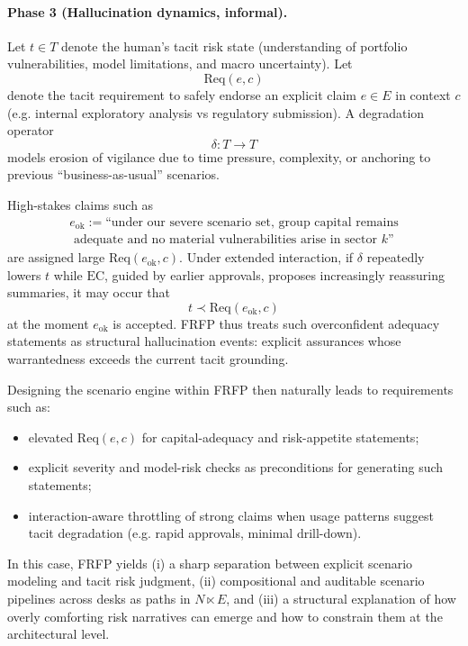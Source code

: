 \paragraph{Phase 3 (Hallucination dynamics, informal).}
Let \(t \in T\) denote the human's tacit risk state (understanding of portfolio vulnerabilities, model limitations, and macro uncertainty). Let
\[
  \mathrm{Req}(e,c)
\]
denote the tacit requirement to safely endorse an explicit claim \(e \in E\) in context \(c\) (e.g. internal exploratory analysis vs regulatory submission). A degradation operator
\[
  \delta: T \to T
\]
models erosion of vigilance due to time pressure, complexity, or anchoring to previous ``business-as-usual'' scenarios.

High-stakes claims such as
\begin{gather*}
  e_{\mathrm{ok}} := \text{``under our severe scenario set, group capital remains}\\
  \text{ adequate and no material vulnerabilities arise in sector \(k\)''}
\end{gather*}
are assigned large \(\mathrm{Req}(e_{\mathrm{ok}},c)\). Under extended interaction, if \(\delta\) repeatedly lowers \(t\) while \(\mathrm{EC}\), guided by earlier approvals, proposes increasingly reassuring summaries, it may occur that
\[
  t \prec \mathrm{Req}(e_{\mathrm{ok}},c)
\]
at the moment \(e_{\mathrm{ok}}\) is accepted. FRFP thus treats such overconfident adequacy statements as structural hallucination events: explicit assurances whose warrantedness exceeds the current tacit grounding.

Designing the scenario engine within FRFP then naturally leads to requirements such as:
\begin{itemize}
  \item elevated \(\mathrm{Req}(e,c)\) for capital-adequacy and risk-appetite statements;
  \item explicit severity and model-risk checks as preconditions for generating such statements;
  \item interaction-aware throttling of strong claims when usage patterns suggest tacit degradation (e.g. rapid approvals, minimal drill-down).
\end{itemize}

\medskip

\noindent In this case, FRFP yields (i) a sharp separation between explicit scenario modeling and tacit risk judgment, (ii) compositional and auditable scenario pipelines across desks as paths in \(N \ltimes E\), and (iii) a structural explanation of how overly comforting risk narratives can emerge and how to constrain them at the architectural level.
